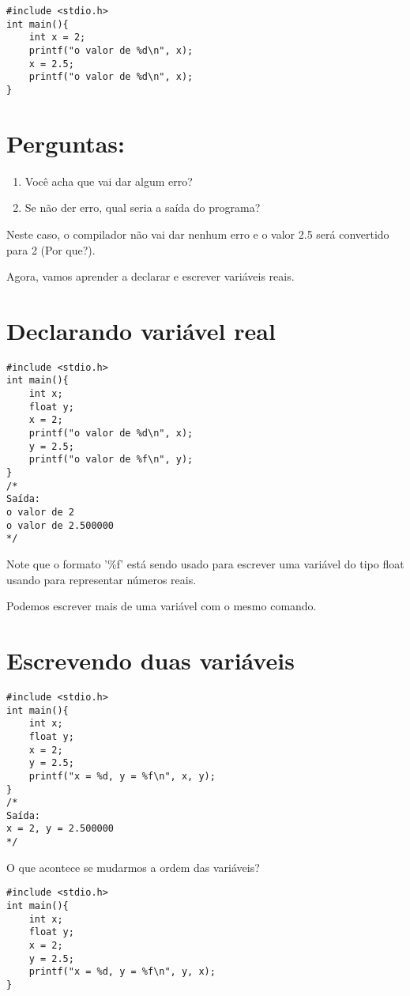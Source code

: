 \documentclass[a4paper,11pt]{article}
\begin{document}
\begin{verbatim}
#include <stdio.h>
int main(){
	int x = 2;
	printf("o valor de %d\n", x);
	x = 2.5;
	printf("o valor de %d\n", x);	 
}
\end{verbatim}

\section*{Perguntas:}
\begin{enumerate}
\item Você acha que vai dar algum erro?
\item Se não der erro, qual seria a saída do programa?
\end{enumerate}

Neste caso, o compilador não vai dar nenhum erro e o valor 2.5 será convertido para 2 (Por que?).

Agora, vamos aprender a declarar e escrever variáveis reais.

\section*{Declarando variável real}

\begin{verbatim}
#include <stdio.h>
int main(){
	int x;
	float y;
	x = 2;
	printf("o valor de %d\n", x);
	y = 2.5;
	printf("o valor de %f\n", y);	 
}
/*
Saída:
o valor de 2
o valor de 2.500000
*/
\end{verbatim}

Note que o formato '\%f' está sendo usado para escrever uma variável do tipo float usando para representar números reais.

Podemos escrever mais de uma variável com o mesmo comando.

\section*{Escrevendo duas variáveis}

\begin{verbatim}
#include <stdio.h>
int main(){
	int x;
	float y;
	x = 2;
	y = 2.5;
	printf("x = %d, y = %f\n", x, y);	 
}
/*
Saída:
x = 2, y = 2.500000
*/
\end{verbatim}

O que acontece se mudarmos a ordem das variáveis?
\begin{verbatim}
#include <stdio.h>
int main(){
	int x;
	float y;
	x = 2;
	y = 2.5;
	printf("x = %d, y = %f\n", y, x);	 
}
\end{verbatim}
\end{document}
